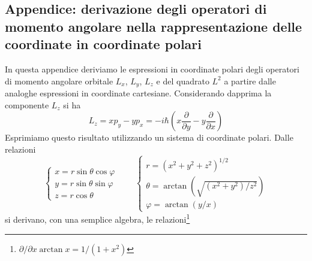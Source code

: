 \documentclass[a4paper,12pt,oneside]{book}
\begin{document}
\subsection{Appendice: derivazione degli operatori di momento angolare nella rappresentazione delle coordinate in coordinate polari}
In questa appendice deriviamo le espressioni in coordinate polari degli operatori di momento angolare orbitale $L_x$, $L_y$, $L_z$ e del quadrato $L^2$ a partire dalle analoghe espressioni in coordinate cartesiane. Considerando dapprima la componente $L_z$ si ha
\begin{equation}
L_z= xp_y - yp_x =-i\hbar \left(x\frac{\partial}{\partial y}- y\frac{\partial}{\partial x}\right)
\label{eq:cap17_11}
\end{equation}
Esprimiamo questo risultato utilizzando un sistema di coordinate polari. Dalle relazioni
\begin{equation}
\begin{cases}
x=r\sin \theta \cos \varphi \\
y=r\sin \theta \sin \varphi \\
z= r\cos\theta
\end{cases}
\qquad
\begin{cases}
r=(x^2+y^2+z^2)^{1/2} \\
\theta=\arctan\left(\sqrt{(x^2+y^2)/z^2}\right) \\
\varphi= \arctan \left(y/x\right)
\end{cases}
\end{equation}
si derivano, con una semplice algebra, le relazioni\footnote{$\partial/\partial x \arctan x = 1/(1+x^2)$}
\end{document}
